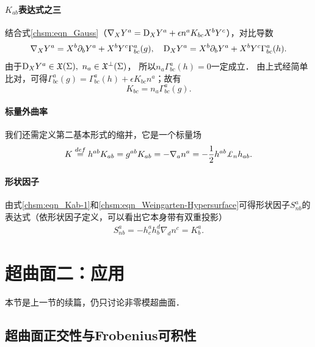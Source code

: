 \paragraph{$K_{ab}$表达式之三}
结合式\eqref{chsm:eqn_Gauss}（${\nabla}_{X} Y^a = {\rm D}_{X} Y^a
+\epsilon n^a K_{bc}  X^bY^c$），对比导数
\begin{align*}
    \nabla_{X}  Y^a  = X^b \partial_b Y^a + X^b Y^c \Gamma^a_{bc}(g), \quad
    {\rm D}_{X} Y^a  = X^b \partial_b Y^a + X^b Y^c \Gamma^a_{bc}(h) .
\end{align*}
由于${\rm D}_{X} Y^a \in \mathfrak{X}(\Sigma),\ {n}_a\in \mathfrak{X}^\bot(\Sigma)$，
所以${n}_a\Gamma_{bc}^a(h)=0$一定成立．
由上式经简单比对，可得$\Gamma^a_{bc}(g) = \Gamma^a_{bc}(h) +\epsilon K_{bc}  {n}^a$；故有
\begin{equation}\label{chsm:eqn_K-Christoffel}
    K_{bc} = {n}_a \Gamma_{bc}^a(g) .
\end{equation}


\paragraph{标量外曲率}
我们还需定义第二基本形式的缩并，它是一个标量场
\begin{equation}\label{chsm:eqn_K-scalar}
    K \overset{def}{=} h^{ab} K_{ab} = g^{ab} K_{ab} =-\nabla_{a} {n}^a
    =-\frac{1}{2}h^{ab}\Lie_{n} h_{ab}.  %
\end{equation}


\paragraph{形状因子}
由式\eqref{chsm:eqn_Kab-1}和\eqref{chsm:eqn_Weingarten-Hypersurface}可得形状因子$S^a_{n b}$的
表达式（依形状因子定义，可以看出它本身带有双重投影）
\begin{align}
    S^a_{n b} =- h_c^a h_b^d \nabla_d n^c= K_{b}^a .
\end{align}






\section{超曲面二：应用}
本节是上一节的续篇，仍只讨论非零模超曲面．


\subsection{超曲面正交性与Frobenius可积性}\label{chsm:sec_hypersurface-orthogonal}

